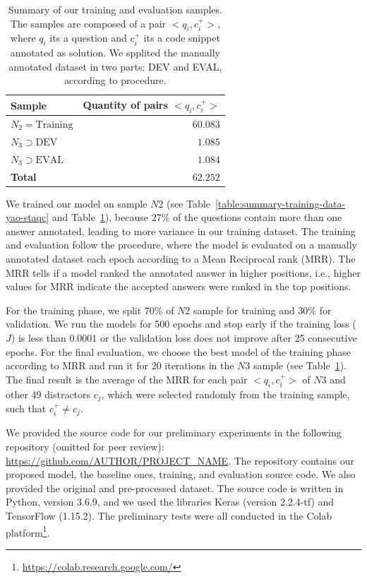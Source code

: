 \documentclass[sigconf]{acmart}
\begin{document}
\begin{table}[h]
\centering
\begin{tabular}{ l r  }
 \hline
 \textbf{Sample} & \textbf{Quantity of pairs $<q_{i}, c_{i}^{+}>$}\\
 \hline
 $N_{2} = \text{Training}$ & $60.083$\\
 
 $N_{3} \supset \text{DEV}$ & $1.085$ \\
 
 $N_{3} \supset \text{EVAL}$ & $1.084$\\
 \hline
 \textbf{Total} & $\bm{62.252}$\\
 \hline
\end{tabular}
\caption{Summary of our training and evaluation samples. The samples are composed of a pair $<q_{i}, c_{i}^{+}>$, where $q_{i}$ its a question and $c_{i}^{+}$ its a code snippet annotated as solution. We spplited the manually annotated dataset in two parts: DEV and EVAL, according to \cite{iyer-etal-2016-summarizing} procedure. }
\label{table:training-sample-division}
\end{table}

We trained our model on sample $N2$ (see Table~\ref{table:summary-training-data-yao-staqc} and Table~\ref{table:training-sample-division}), because 27\% of the questions contain more than one answer annotated, leading to more variance in our training dataset. The training and evaluation follow the \cite{iyer-etal-2016-summarizing} procedure, where the model is evaluated on a manually annotated dataset each epoch according to a Mean Reciprocal rank (MRR). The MRR tells if a model ranked the annotated answer in higher positions, i.e., higher values for MRR indicate the accepted answers were ranked in the top positions.

For the training phase, we split 70\% of $N2$ sample for training and 30\% for validation. We run the models for 500 epochs and stop early if the training loss ($J$) is less than $0.0001$ or the validation loss does not improve after 25 consecutive epochs. For the final evaluation, we choose the best model of the training phase according to MRR and run it for 20 iterations in the $N3$ sample (see Table~\ref{table:training-sample-division}). The final result is the average of the MRR for each pair $<q_{i}, c_{i}^{+}>$ of $N3$ and other 49 distractors $c_{j}$, which were selected randomly from the training sample, such that $c_{i}^{+} \neq c_{j}$.

 We provided the source code for our preliminary experiments in the following repository (omitted for peer review): \url{https://github.com/AUTHOR/PROJECT_NAME}. The repository contains our proposed model, the baseline ones, training, and evaluation source code. We also provided the original and pre-processed dataset. The source code is written in Python, version 3.6.9, and we used the libraries Keras (version 2.2.4-tf) and TensorFlow (1.15.2). The preliminary tests were all conducted in the Colab platform\footnote{\url{https://colab.research.google.com/}}.
\end{document}

